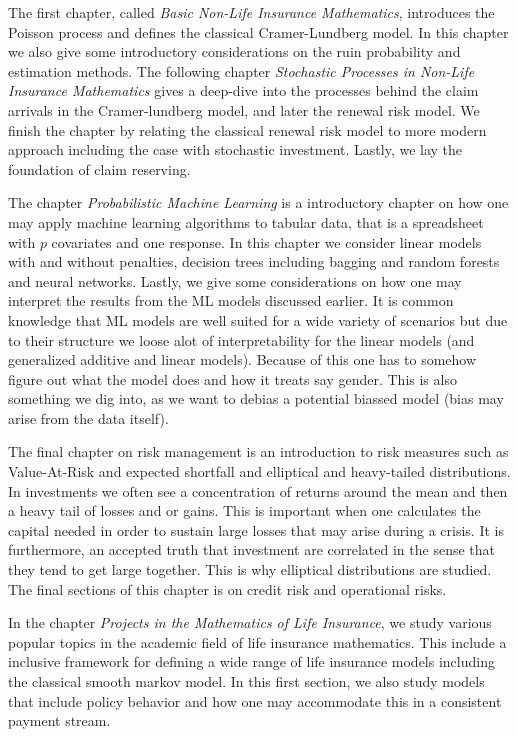 \documentclass[a4paper,10pt,openany]{book}
\begin{document}
The first chapter, called \emph{Basic Non-Life Insurance Mathematics}, introduces the Poisson process and defines the classical Cramer-Lundberg model. In this chapter we also give some introductory considerations on the ruin probability and estimation methods. The following chapter \emph{Stochastic Processes in Non-Life Insurance Mathematics} gives a deep-dive into the processes behind the claim arrivals in the Cramer-lundberg model, and later the renewal risk model. We finish the chapter by relating the classical renewal risk model to more modern approach including the case with stochastic investment. Lastly, we lay the foundation of claim reserving.

The chapter \emph{Probabilistic Machine Learning} is a introductory chapter on how one may apply machine learning algorithms to tabular data, that is a spreadsheet with \(p\) covariates and one response. In this chapter we consider linear models with and without penalties, decision trees including bagging and random forests and neural networks. Lastly, we give some considerations on how one may interpret the results from the ML models discussed earlier. It is common knowledge that ML models are well suited for a wide variety of scenarios but due to their structure we loose alot of interpretability for the linear models (and generalized additive and linear models). Because of this one has to somehow figure out what the model does and how it treats say gender. This is also something we dig into, as we want to debias a potential biassed model (bias may arise from the data itself).

The final chapter on risk management is an introduction to risk measures such as Value-At-Risk and expected shortfall and elliptical and heavy-tailed distributions. In investments we often see a concentration of returns around the mean and then a heavy tail of losses and or gains. This is important when one calculates the capital needed in order to sustain large losses that may arise during a crisis. It is furthermore, an accepted truth that investment are correlated in the sense that they tend to get large together. This is why elliptical distributions are studied. The final sections of this chapter is on credit risk and operational risks.

In the chapter \emph{Projects in the Mathematics of Life Insurance}, we study various popular topics in the academic field of life insurance mathematics. This include a inclusive framework for defining a wide range of life insurance models including the classical smooth markov model. In this first section, we also study models that include policy behavior and how one may accommodate this in a consistent payment stream.
\end{document}
